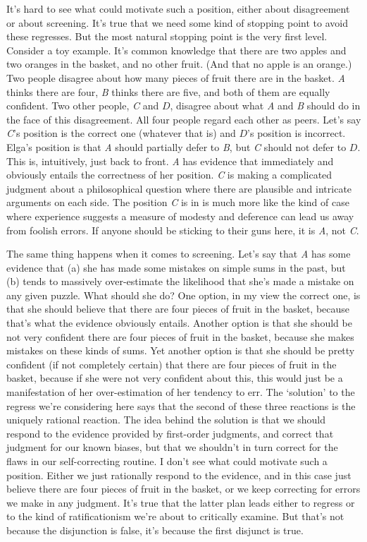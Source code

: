 \documentclass[
  10pt,
  letterpaper,
  DIV=11,
  numbers=noendperiod,
  twoside]{scrartcl}
\begin{document}
It's hard to see what could motivate such a position, either about
disagreement or about screening. It's true that we need some kind of
stopping point to avoid these regresses. But the most natural stopping
point is the very first level. Consider a toy example. It's common
knowledge that there are two apples and two oranges in the basket, and
no other fruit. (And that no apple is an orange.) Two people disagree
about how many pieces of fruit there are in the basket. \emph{A} thinks
there are four, \emph{B} thinks there are five, and both of them are
equally confident. Two other people, \emph{C} and \(D\), disagree about
what \emph{A} and \emph{B} should do in the face of this disagreement.
All four people regard each other as peers. Let's say \emph{C}'s
position is the correct one (whatever that is) and \(D\)'s position is
incorrect. Elga's position is that \emph{A} should partially defer to
\emph{B}, but \emph{C} should not defer to \(D\). This is, intuitively,
just back to front. \emph{A} has evidence that immediately and obviously
entails the correctness of her position. \emph{C} is making a
complicated judgment about a philosophical question where there are
plausible and intricate arguments on each side. The position \emph{C} is
in is much more like the kind of case where experience suggests a
measure of modesty and deference can lead us away from foolish errors.
If anyone should be sticking to their guns here, it is \emph{A}, not
\emph{C}.

The same thing happens when it comes to screening. Let's say that
\emph{A} has some evidence that (a) she has made some mistakes on simple
sums in the past, but (b) tends to massively over-estimate the
likelihood that she's made a mistake on any given puzzle. What should
she do? One option, in my view the correct one, is that she should
believe that there are four pieces of fruit in the basket, because
that's what the evidence obviously entails. Another option is that she
should be not very confident there are four pieces of fruit in the
basket, because she makes mistakes on these kinds of sums. Yet another
option is that she should be pretty confident (if not completely
certain) that there are four pieces of fruit in the basket, because if
she were not very confident about this, this would just be a
manifestation of her over-estimation of her tendency to err. The
`solution' to the regress we're considering here says that the second of
these three reactions is the uniquely rational reaction. The idea behind
the solution is that we should respond to the evidence provided by
first-order judgments, and correct that judgment for our known biases,
but that we shouldn't in turn correct for the flaws in our
self-correcting routine. I don't see what could motivate such a
position. Either we just rationally respond to the evidence, and in this
case just believe there are four pieces of fruit in the basket, or we
keep correcting for errors we make in any judgment. It's true that the
latter plan leads either to regress or to the kind of ratificationism
we're about to critically examine. But that's not because the
disjunction is false, it's because the first disjunct is true.
\end{document}
